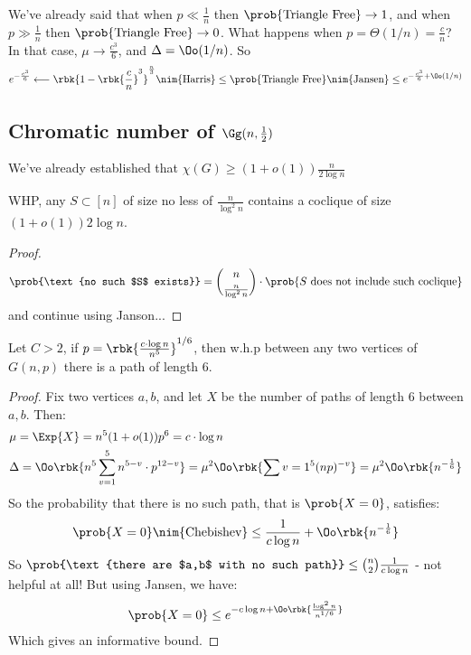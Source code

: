 \documentclass[a4paper, 11pt, oneside]{book}
\begin{document}
We've already said that when $p\ll\frac{1}{n}$ then $\prob{\text{Triangle Free}}\to 1$, and when $p\gg\frac{1}{n}$ then $\prob{\text{Triangle Free}}\to 0$. What happens when $p = \Theta(1/n) = \frac{c}{n}$? In that case, $\mu \to \frac{c^3}{6}$, and $\Delta = \Oo(1/n)$. So
\[
e^{-\frac{c^3}{6}}\longleftarrow \rbk{1-\rbk{\frac{c}{n}}^3}^{\frac{n}{3}} \nim{\text{Harris}}\le \prob{\text{Triangle Free}} \nim{\text{Jansen}}\le e^{-\frac{c^3}{6} + \Oo(1/n)}
\]
\subsection{Chromatic number of $\Gg(n,\frac{1}{2})$}
We've already established that $\chi(G)\ge (1+o(1))\frac{n}{2\log n}$
\begin{lemma}
	WHP, any $S\subset [n]$ of size no less of $\frac{n}{\log^2 n}$ contains a coclique of size $(1+o(1))2\log n$.
\end{lemma}
\begin{proof}
\begin{align*}
	\prob{\text{no such $S$ exists}} = {n\choose \frac{n}{\log^2 n}}\cdot \prob{S\text{ does not include such coclique}}
\end{align*}	
and continue using Janson...
\end{proof}
\begin{example}
\begin{claim}
	Let $C>2$, if $p = \rbk{\frac{c\cdot \log n}{n^5	}}^{1/6}$, then w.h.p between any two vertices of $G(n,p)$ there is a path of length $6$.
\end{claim}
\begin{proof}
	Fix two vertices $a,b$, and let $X$ be the number of paths of length $6$ between $a,b$. Then:
	\begin{align*}
	& \mu = \Exp{X} = n^5(1+o(1)) p^6 = c\cdot \log n	\\
	& \Delta = \Oo\rbk{n^5 \sum_{v=1}^5n^{5-v}\cdot p^{12-v}} = \mu^2\Oo\rbk{\sum{v=1}^5 (np)^{-v}} = \mu^2\Oo\rbk{n^{-\frac{1}{6}}}
	\end{align*}
	So the probability that there is no such path, that is
	$\prob{X = 0}$, satisfies:
	\begin{align*}
		\prob{X = 0}\nim{\text{Chebishev}}\le \frac{1}{c\log n} + \Oo\rbk{n^{-\frac{1}{6}}}
	\end{align*}
	So $\prob{\text{there are $a,b$ with no such path}}\le {n\choose 2}\frac{1}{c\log n}$ - not helpful at all! But using Jansen, we have:
	\begin{align*}
	\prob{X = 0}\le e^{-c\log n + \Oo\rbk{\frac{\log^2n}{n^{1/6}}}}
	\end{align*}
	Which gives an informative bound.
\end{proof}
\end{example}
\end{document}
